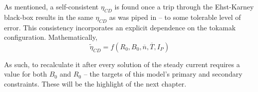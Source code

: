 As mentioned, a self-consistent $\eta_{CD}$ is found once a trip through the Ehst-Karney black-box results in the same $\eta_{CD}$ as was piped in -- to some tolerable level of error. This consistency incorporates an explicit dependence on the tokamak configuration. Mathematically,
\begin{equation}
	\tilde \eta_{CD} = f( R_0, B_0, \overline n, \overline T, I_P )
\end{equation}

As such, to recalculate it after every solution of the steady current requires a value for both $B_0$ and $R_0$ -- the targets of this model's primary and secondary constraints. These will be the highlight of the next chapter.

%
